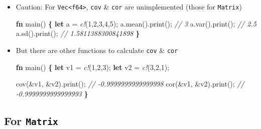 \documentclass[]{book}
\newenvironment{Shaded}{\begin{snugshade}}{\end{snugshade}}
\newcommand{\CommentTok}[1]{\textcolor[rgb]{0.56,0.35,0.01}{\textit{#1}}}
\newcommand{\DecValTok}[1]{\textcolor[rgb]{0.00,0.00,0.81}{#1}}
\newcommand{\KeywordTok}[1]{\textcolor[rgb]{0.13,0.29,0.53}{\textbf{#1}}}
\newcommand{\NormalTok}[1]{#1}
\newcommand{\OperatorTok}[1]{\textcolor[rgb]{0.81,0.36,0.00}{\textbf{#1}}}
\newcommand{\PreprocessorTok}[1]{\textcolor[rgb]{0.56,0.35,0.01}{\textit{#1}}}
\begin{document}
\begin{itemize}
\item
  Caution: For \texttt{Vec\textless{}f64\textgreater{}}, \texttt{cov} \& \texttt{cor} are unimplemented (those for \texttt{Matrix})

\begin{Shaded}
\begin{Highlighting}[]
\KeywordTok{fn}\NormalTok{ main() }\OperatorTok{\{}
    \KeywordTok{let}\NormalTok{ a = }\PreprocessorTok{c!}\NormalTok{(}\DecValTok{1}\NormalTok{,}\DecValTok{2}\NormalTok{,}\DecValTok{3}\NormalTok{,}\DecValTok{4}\NormalTok{,}\DecValTok{5}\NormalTok{);}
\NormalTok{    a.mean().print(); }\CommentTok{// 3}
\NormalTok{    a.var().print();  }\CommentTok{// 2.5}
\NormalTok{    a.sd().print();   }\CommentTok{// 1.5811388300841898}
\OperatorTok{\}}
\end{Highlighting}
\end{Shaded}
\item
  But there are other functions to calculate \texttt{cov} \& \texttt{cor}

\begin{Shaded}
\begin{Highlighting}[]
\KeywordTok{fn}\NormalTok{ main() }\OperatorTok{\{}
    \KeywordTok{let}\NormalTok{ v1 = }\PreprocessorTok{c!}\NormalTok{(}\DecValTok{1}\NormalTok{,}\DecValTok{2}\NormalTok{,}\DecValTok{3}\NormalTok{);}
    \KeywordTok{let}\NormalTok{ v2 = }\PreprocessorTok{c!}\NormalTok{(}\DecValTok{3}\NormalTok{,}\DecValTok{2}\NormalTok{,}\DecValTok{1}\NormalTok{);}

\NormalTok{    cov(&v1, &v2).print(); }\CommentTok{// -0.9999999999999998}
\NormalTok{    cor(&v1, &v2).print(); }\CommentTok{// -0.9999999999999993}
\OperatorTok{\}}
\end{Highlighting}
\end{Shaded}
\end{itemize}

\hypertarget{for-matrix}{%
\subsection{\texorpdfstring{For \texttt{Matrix}}{For Matrix}}\label{for-matrix}}
\end{document}

